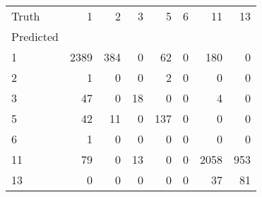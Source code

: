 \begin{tabular}{lrrrrrrr}
\toprule
Truth & 1 & 2 & 3 & 5 & 6 & 11 & 13 \\
Predicted &  &  &  &  &  &  &  \\
\midrule
1 & 2389 & 384 & 0 & 62 & 0 & 180 & 0 \\
2 & 1 & 0 & 0 & 2 & 0 & 0 & 0 \\
3 & 47 & 0 & 18 & 0 & 0 & 4 & 0 \\
5 & 42 & 11 & 0 & 137 & 0 & 0 & 0 \\
6 & 1 & 0 & 0 & 0 & 0 & 0 & 0 \\
11 & 79 & 0 & 13 & 0 & 0 & 2058 & 953 \\
13 & 0 & 0 & 0 & 0 & 0 & 37 & 81 \\
\bottomrule
\end{tabular}
